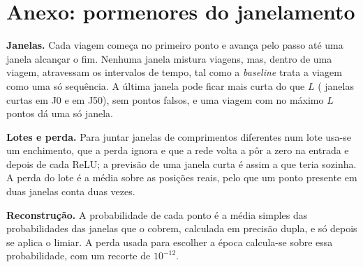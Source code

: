 \documentclass{article}
\begin{document}
\clearpage
\appendix
\raggedbottom

\section{Anexo: pormenores do janelamento}
\label{sec:anexo}

\textbf{Janelas.} Cada viagem começa no primeiro ponto e avança pelo passo até uma janela alcançar o fim. Nenhuma janela mistura viagens, mas, dentro de uma viagem, atravessam os intervalos de tempo, tal como a \emph{baseline} trata a viagem como uma só sequência. A última janela pode ficar mais curta do que $L$ (\resJZJanelasCurtas{} janelas curtas em J0 e \resJCJanelasCurtas{} em J50), sem pontos falsos, e uma viagem com no máximo $L$ pontos dá uma só janela.

\textbf{Lotes e perda.} Para juntar janelas de comprimentos diferentes num lote usa-se um enchimento, que a perda ignora e que a rede volta a pôr a zero na entrada e depois de cada ReLU; a previsão de uma janela curta é assim a que teria sozinha. A perda do lote é a média sobre as posições reais, pelo que um ponto presente em duas janelas conta duas vezes.

\textbf{Reconstrução.} A probabilidade de cada ponto é a média simples das probabilidades das janelas que o cobrem, calculada em precisão dupla, e só depois se aplica o limiar. A perda usada para escolher a época calcula-se sobre essa probabilidade, com um recorte de $10^{-12}$.
\end{document}
